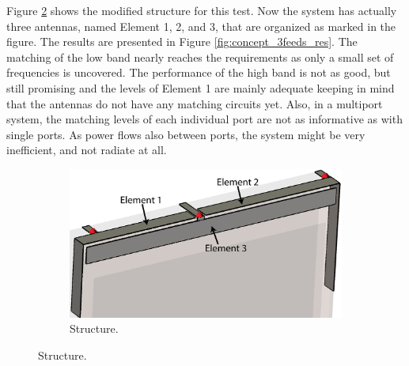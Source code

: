 Figure \ref{fig:concept_3feeds_struct} shows the modified structure for this test. Now the system has actually three antennas, named Element 1, 2, and 3, that are organized as marked in the figure. The results are presented in Figure \ref{fig:concept_3feeds_res}. The matching of the low band nearly reaches the requirements as only a small set of frequencies is uncovered. The performance of the high band is not as good, but still promising and the levels of Element 1 are mainly adequate keeping in mind that the antennas do not have any matching circuits yet. Also, in a multiport system, the matching levels of each individual port are not as informative as with single ports. As power flows also between ports, the system might be very inefficient, and not radiate at all.
\begin{figure}[H]
    \centering
    \vspace{-10pt}
    \begin{subfigure}[b]{0.49\textwidth}
        \includegraphics[width=\textwidth]{img/concept_3feed_struct.eps}
        \caption{Structure.}
        \label{fig:concept_3feeds_struct}
    \end{subfigure}
\end{figure}
